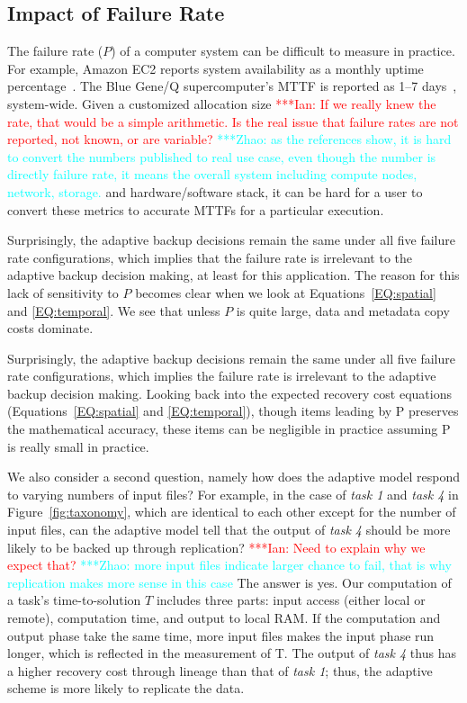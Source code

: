 \documentclass{sig-alternate}
\newcommand{\iannote}[1]{ {\textcolor{red}    { ***Ian:      #1 }}}
\newcommand{\zhaonote}[1]{{\textcolor{cyan}    { ***Zhao:      #1 }}}
\newcommand{\iannote}[1]{}
\newcommand{\zhaonote}[1]{}
\begin{document}
\subsection{Impact of Failure Rate}
\label{sec:Perf:Failure}
The failure rate ($P$) of a computer system can be difficult to measure in practice.
For example, Amazon EC2 reports  system availability as a monthly uptime percentage~\cite{AWS-SLA}.
The Blue Gene/Q supercomputer's MTTF is reported as 1--7 days~\cite{Snir-resilience}, system-wide.
Given a customized allocation size
\iannote{If we really knew the rate, that would be a simple arithmetic. Is the real issue that
failure rates are not reported, not known, or are variable?} 
\zhaonote{as the references show, it is hard to convert the numbers published to real use case, even though the number is directly failure rate, it means the overall system including compute nodes, network, storage.}
and hardware/software stack, it can be hard for a user to convert these metrics to accurate MTTFs for a particular execution.

Surprisingly, the adaptive backup decisions remain the same under all five failure rate configurations, which implies that the failure rate is irrelevant to the adaptive backup decision making, at least for this application.
The reason for this lack of sensitivity to $P$ becomes clear when we look at Equations~\ref{EQ:spatial} and \ref{EQ:temporal}.
We see that unless $P$ is quite large, data and metadata copy costs dominate.

Surprisingly, the adaptive backup decisions remain the same under all five failure rate configurations, which implies the failure rate is irrelevant to the adaptive backup decision making. Looking back into the expected recovery cost equations (Equations~\ref{EQ:spatial} and \ref{EQ:temporal}), though items leading by P preserves the mathematical accuracy, these items can be negligible in practice assuming P is really small in practice.

We also consider a second question, namely how does the adaptive model respond to varying numbers of input files?
For example, in the case of {\em task 1} and {\em task 4} in Figure~\ref{fig:taxonomy}, which are identical to each other except for the number of input files, can the adaptive model tell that the output of {\em task 4} should be more likely to be backed up through replication?\iannote{Need to explain why we expect that?}\zhaonote{more input files indicate larger chance to fail, that is why replication makes more sense in this case}
The answer is yes.
Our computation of a task's time-to-solution $T$ includes three parts: input access (either local or remote), computation time, and output to local RAM. If the computation and output phase take the same time, more input files makes the input phase run longer, which is reflected in the measurement of T. The output of {\em task 4} thus has a higher recovery cost through lineage than that of {\em task 1}; thus, the adaptive scheme is more likely to replicate the data.
\end{document}
